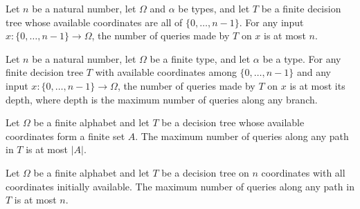 \begin{theorem}
\label{FABL.FiniteDecisionTree.queryCount_le_dimension}
\leanok
{}
Let $n$ be a natural number, let $\Omega$ and $\alpha$ be types, and let $T$ be a finite
decision tree whose available coordinates are all of $\{0,\ldots,n-1\}$. For any input
$x:\{0,\ldots,n-1\}\to\Omega$, the number of queries made by $T$ on $x$ is at most $n$.
\end{theorem}

\begin{theorem}
\label{FABL.FiniteDecisionTree.queryCount_le_depth}
\leanok
{}
Let $n$ be a natural number, let $\Omega$ be a finite type, and let $\alpha$ be a type.
For any finite decision tree $T$ with available coordinates among $\{0,\ldots,n-1\}$ and
any input $x:\{0,\ldots,n-1\}\to\Omega$, the number of queries made by $T$ on $x$ is at
most its depth, where depth is the maximum number of queries along any branch.
\end{theorem}

\begin{theorem}
\label{FABL.FiniteDecisionTree.depth_le_card_available}
\leanok
{}
Let $\Omega$ be a finite alphabet and let $T$ be a decision tree whose available
coordinates form a finite set $A$. The maximum number of queries along any path in $T$
is at most $|A|$.
\end{theorem}

\begin{theorem}
\label{FABL.FiniteDecisionTree.depth_le_dimension}
\leanok
{}
Let $\Omega$ be a finite alphabet and let $T$ be a decision tree on $n$ coordinates with
all coordinates initially available. The maximum number of queries along any path in $T$
is at most $n$.
\end{theorem}

